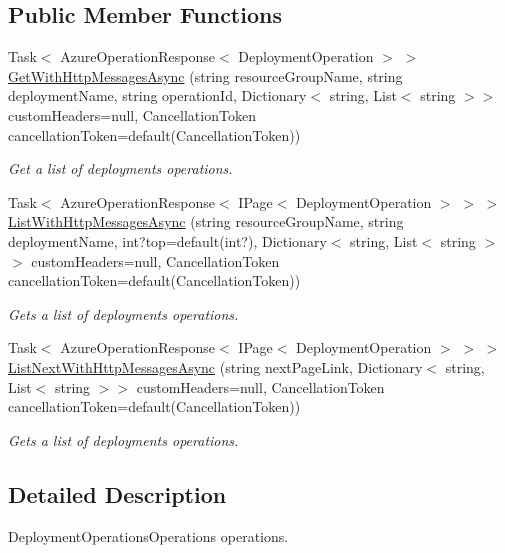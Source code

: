 \subsection*{Public Member Functions}
\begin{DoxyCompactItemize}
\item 
Task$<$ Azure\+Operation\+Response$<$ Deployment\+Operation $>$ $>$ \hyperlink{interface_microsoft_1_1_azure_1_1_management_1_1_resources_1_1_i_deployment_operations_operations_ae80578def07219d0b48d609cbfe95706}{Get\+With\+Http\+Messages\+Async} (string resource\+Group\+Name, string deployment\+Name, string operation\+Id, Dictionary$<$ string, List$<$ string $>$$>$ custom\+Headers=null, Cancellation\+Token cancellation\+Token=default(Cancellation\+Token))
\begin{DoxyCompactList}\small\item\em Get a list of deployments operations. \end{DoxyCompactList}\item 
Task$<$ Azure\+Operation\+Response$<$ I\+Page$<$ Deployment\+Operation $>$ $>$ $>$ \hyperlink{interface_microsoft_1_1_azure_1_1_management_1_1_resources_1_1_i_deployment_operations_operations_acf1eb319eb9d4f32f7bad1c51cc1a26a}{List\+With\+Http\+Messages\+Async} (string resource\+Group\+Name, string deployment\+Name, int?top=default(int?), Dictionary$<$ string, List$<$ string $>$$>$ custom\+Headers=null, Cancellation\+Token cancellation\+Token=default(Cancellation\+Token))
\begin{DoxyCompactList}\small\item\em Gets a list of deployments operations. \end{DoxyCompactList}\item 
Task$<$ Azure\+Operation\+Response$<$ I\+Page$<$ Deployment\+Operation $>$ $>$ $>$ \hyperlink{interface_microsoft_1_1_azure_1_1_management_1_1_resources_1_1_i_deployment_operations_operations_afe2641bafcd0543b82d6faa599b3d588}{List\+Next\+With\+Http\+Messages\+Async} (string next\+Page\+Link, Dictionary$<$ string, List$<$ string $>$$>$ custom\+Headers=null, Cancellation\+Token cancellation\+Token=default(Cancellation\+Token))
\begin{DoxyCompactList}\small\item\em Gets a list of deployments operations. \end{DoxyCompactList}\end{DoxyCompactItemize}


\subsection{Detailed Description}
Deployment\+Operations\+Operations operations. 



